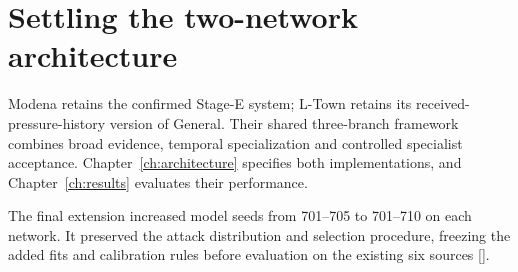 \section{Settling the two-network architecture}
Modena retains the confirmed Stage-E system; L-Town retains its received-pressure-history version of General. Their shared three-branch framework combines broad evidence, temporal specialization and controlled specialist acceptance. Chapter~\ref{ch:architecture} specifies both implementations, and Chapter~\ref{ch:results} evaluates their performance.

The final extension increased model seeds from 701--705 to 701--710 on each network. It preserved the attack distribution and selection procedure, freezing the added fits and calibration rules before evaluation on the existing six sources [].
